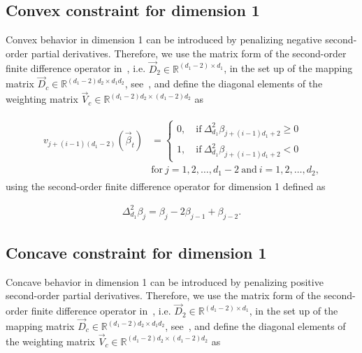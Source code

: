 \subsection{Convex constraint for dimension 1} \label{subsec:CONV-TP-one-dim}

Convex behavior in dimension 1 can be introduced by penalizing negative second-order partial derivatives. Therefore, we  use the matrix form of the second-order finite difference operator in~, i.e. $\vec{D}_2 \in \mathbb{R}^{(d_1-2) \times d_1}$, in the set up of the mapping matrix $\vec{D}_c \in \mathbb{R}^{(d_1-2)d_2 \times d_1d_2}$, see~, and define the diagonal elements of the weighting matrix $\vec{V}_c \in \mathbb{R}^{(d_1-2)d_2 \times (d_1-2)d_2}$ as

\begin{align}
	\begin{split}
	v_{j+(i-1)(d_1-2)}(\vec{\beta}_t) {}&= \begin{cases}
		0, \quad \text{if} \ \Delta^2_{d_1} \beta_{j+(i-1)d_1+2} \ge 0 \\ 
		1, \quad \text{if} \ \Delta^2_{d_1} \beta_{j+(i-1)d_1+2} < 0
	\end{cases}	\\ {}& \text{for} \ j=1,2,\dots,d_1-2 \ \text{and} \ i=1,2,\dots,d_2,
	\end{split}
\end{align}
%
using the second-order finite difference operator for dimension 1 defined as

\begin{align} \label{eq:FD-operator2-dim1}
	\Delta^2_{d_1} \beta_j = \beta_j - 2\beta_{j-1} + \beta_{j-2}.
\end{align}


\subsection{Concave constraint for dimension 1} \label{subsec:CONC-TP-one-dim}

Concave behavior in dimension 1 can be introduced by penalizing positive second-order partial derivatives. Therefore, we  use the matrix form of the second-order finite difference operator in~, i.e. $\vec{D}_2 \in \mathbb{R}^{(d_1-2) \times d_1}$, in the set up of the mapping matrix $\vec{D}_c \in \mathbb{R}^{(d_1-2)d_2 \times d_1d_2}$, see~, and define the diagonal elements of the weighting matrix $\vec{V}_c \in \mathbb{R}^{(d_1-2)d_2 \times (d_1-2)d_2}$ as

